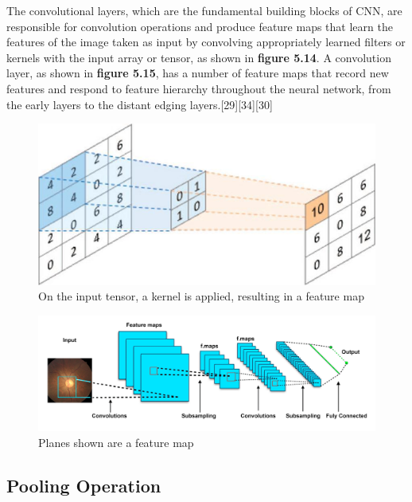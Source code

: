 \vspace{5mm}
The convolutional layers, which are the fundamental building blocks of CNN, are responsible for convolution operations and produce feature maps that learn the features of the image taken as input by convolving appropriately learned filters or kernels with the input array or tensor, as shown in \textbf{figure 5.14}. A convolution layer, as shown in \textbf{figure 5.15}, has a number of feature maps that record new features and respond to feature hierarchy throughout the neural network, from the early layers to the distant edging layers.[29][34][30]

\newpage
\vspace{5mm}
\begin{figure}[hbt!]
\centering
\includegraphics[scale=1]{images/fig-18.png}
\caption{On the input tensor, a kernel is applied, resulting in a feature map}
\label{fig:x On the input tensor, a kernel is applied, resulting in a feature map}
\end{figure}

\vspace{5mm}
\begin{figure}[hbt!]
\centering
\includegraphics[scale=0.4]{images/planes shown are a feature map.png}
\caption{Planes shown are a feature map}
\label{fig:x Planes shown are a feature map}
\end{figure}

\subsection{Pooling Operation}

